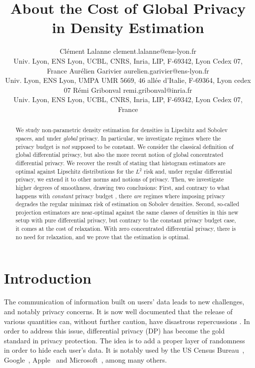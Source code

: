 \documentclass[10pt]{article} %
\title{About the Cost of Global Privacy in Density Estimation}
\author{{%
 \name Clément Lalanne \email clement.lalanne@ens-lyon.fr \\
 \addr Univ. Lyon, ENS Lyon, UCBL, CNRS, Inria,  LIP, F-69342, Lyon Cedex 07, France
 \AND
 \name Aurélien Garivier \email aurelien.garivier@ens-lyon.fr \\
 \addr Univ. Lyon, ENS Lyon, UMPA UMR 5669, 46 allée d'Italie, F-69364, Lyon cedex 07%
 \AND
 \name Rémi Gribonval \email remi.gribonval@inria.fr\\
 \addr Univ. Lyon, ENS Lyon, UCBL, CNRS, Inria,  LIP, F-69342, Lyon Cedex 07, France%
}}
\newcommand\CL[1]{\textcolor{blue}{#1}}
\begin{document}
\maketitle

\begin{abstract}%
  We study non-parametric density estimation for densities in Lipschitz and Sobolev spaces, and under \emph{global} privacy. In particular, we investigate regimes where the privacy budget is \emph{not} supposed to be constant. We consider the classical definition of global differential privacy, but also the more recent notion of global concentrated differential privacy. We recover the result of \citet{barber2014privacy} stating that histogram estimators are optimal against Lipschitz distributions for the $L^2$ risk and, under regular differential privacy, we extend it to other norms and notions of privacy. Then, we investigate higher degrees of smoothness, drawing two conclusions: First, and contrary to what happens with \emph{constant} privacy budget \citep{wasserman2010statistical}, there \emph{are} regimes where imposing privacy degrades the regular minimax risk of estimation on Sobolev densities. Second, so-called projection estimators are near-optimal against the same classes of densities in this new setup with pure differential privacy, but contrary to the constant privacy budget case, it comes at the cost of relaxation. With zero concentrated differential privacy, there is no need for relaxation, and we prove that the estimation is optimal.
\end{abstract}


\section{Introduction}

The communication of information built on users' data leads to new challenges, and notably privacy concerns. It is now well documented that the release of various quantities can, without further caution, have disastrous repercussions \citep{narayanan2006break,backstrom2007wherefore,fredrikson2015model,dinur2003revealing,homer2008resolving,loukides2010disclosure,narayanan2008robust,sweeney2000simple,gonon2023sparsity,wagner2018technical,sweeney2002k}.
In order to address this issue, differential privacy (DP) \citep{dwork2006calibrating} has become the gold standard in privacy protection. The idea is to add a proper layer of randomness %
in order to hide each user's data. It is notably used by the US Census Bureau~\citep{abowd2018us}, Google~\citep{erlingsson2014rappor}, Apple~\citep{thakurta2017learning} and Microsoft~\citep{ding2017collecting}, among many others. 
\end{document}
